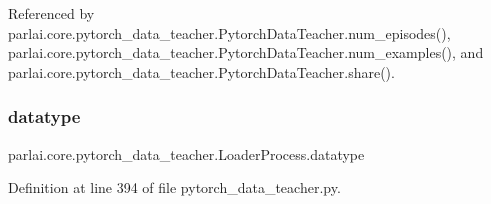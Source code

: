 Referenced by parlai.\+core.\+pytorch\+\_\+data\+\_\+teacher.\+Pytorch\+Data\+Teacher.\+num\+\_\+episodes(), parlai.\+core.\+pytorch\+\_\+data\+\_\+teacher.\+Pytorch\+Data\+Teacher.\+num\+\_\+examples(), and parlai.\+core.\+pytorch\+\_\+data\+\_\+teacher.\+Pytorch\+Data\+Teacher.\+share().

\mbox{\label{classparlai_1_1core_1_1pytorch__data__teacher_1_1LoaderProcess_acfb55a2adc1b4b4df2e1fb68239c60ba}} 
\subsubsection{\texorpdfstring{datatype}{datatype}}
{\footnotesize\ttfamily parlai.\+core.\+pytorch\+\_\+data\+\_\+teacher.\+Loader\+Process.\+datatype}



Definition at line 394 of file pytorch\+\_\+data\+\_\+teacher.\+py.



